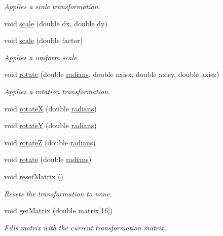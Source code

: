 \begin{DoxyCompactItemize}
\begin{DoxyCompactList}\small\item\em \-Applies a scale transformation. \end{DoxyCompactList}\item 
void \hyperlink{namespacecprocessing_a9f393203e195c6843c3880c952432ec7}{scale} (double dx, double dy)
\item 
void \hyperlink{namespacecprocessing_a987be2f2fbe7386914a94dac7343801e}{scale} (double factor)
\begin{DoxyCompactList}\small\item\em \-Applies a uniform scale. \end{DoxyCompactList}\item 
void \hyperlink{namespacecprocessing_afa46f333138777dcaa09eeff125a9d39}{rotate} (double \hyperlink{namespacecprocessing_a8e4f15390e12437ed626441da1cc767d}{radians}, double axisx, double axisy, double axisz)
\begin{DoxyCompactList}\small\item\em \-Applies a rotation transformation. \end{DoxyCompactList}\item 
void \hyperlink{namespacecprocessing_af0ade51f94b423933c31eafd92b96ab8}{rotate\-X} (double \hyperlink{namespacecprocessing_a8e4f15390e12437ed626441da1cc767d}{radians})
\item 
void \hyperlink{namespacecprocessing_ab42ccf131e68079e8333e209b5bbd70e}{rotate\-Y} (double \hyperlink{namespacecprocessing_a8e4f15390e12437ed626441da1cc767d}{radians})
\item 
void \hyperlink{namespacecprocessing_adb7051057100be20b837209c6a479fc6}{rotate\-Z} (double \hyperlink{namespacecprocessing_a8e4f15390e12437ed626441da1cc767d}{radians})
\item 
void \hyperlink{namespacecprocessing_a14fb0bc1e493f50d941da1f95cfaf227}{rotate} (double \hyperlink{namespacecprocessing_a8e4f15390e12437ed626441da1cc767d}{radians})
\item 
void \hyperlink{namespacecprocessing_af2d05683bc26cdc849748dbcc4fd9633}{reset\-Matrix} ()
\begin{DoxyCompactList}\small\item\em \-Resets the transformation to none. \end{DoxyCompactList}\item 
void \hyperlink{namespacecprocessing_a239beab716293400201d76c2b161bf94}{get\-Matrix} (double matrix\mbox{[}16\mbox{]})
\begin{DoxyCompactList}\small\item\em \-Fills matrix with the current transformation matrix. \end{DoxyCompactList}\item 

\end{DoxyCompactItemize}

